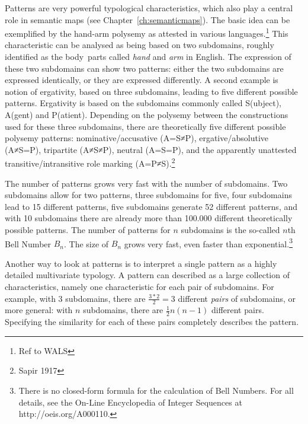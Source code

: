 %
Patterns are very powerful typological characteristics, which also play a central role in semantic maps (see Chapter~\ref{ch:semanticmaps}). The basic idea can be exemplified by the hand-arm polysemy as attested in various languages.\footnote{Ref to WALS} This characteristic can be analysed as being based on two subdomains, roughly identified as the body~parts called \textit{hand} and \textit{arm} in English. The expression of these two subdomains can show two patterns: either the two subdomains are expressed identically, or they are expressed differently. A second example is notion of ergativity, based on three subdomains, leading to five different possible patterns. Ergativity is based on the subdomains commonly called S(ubject), A(gent) and P(atient). Depending on the polysemy between the  constructions used for these three subdomains, there are theoretically five different possible polysemy patterns: nominative/accusative (A=S≠P), ergative/absolutive (A≠S=P), tripartite (A≠S≠P), neutral (A=S=P), and the apparently unattested transitive/intransitive role marking (A=P≠S).\footnote{Sapir 1917}

The number of patterns grows very fast with the number of subdomains. Two subdomains allow for two patterns, three subdomains for five, four subdomains lead to 15 different patterns, five subdomains generate 52 different patterns, and with 10 subdomains there are already more than 100.000 different theoretically possible patterns. The number of patterns for $n$ subdomains is the so-called $n$th Bell Number $B_{n}$. The size of $B_{n}$ grows very fast, even faster than exponential.\footnote{There is no closed-form formula for the calculation of Bell Numbers. For all details, see the On-Line Encyclopedia of Integer Sequences at http://oeis.org/A000110.}

Another way to look at patterns is to interpret a single pattern as a highly detailed multivariate typology. A pattern can described as a large collection of characteristics, namely one characteristic for each pair of subdomains. For example, with 3 subdomains, there are $\frac{3*2}{2} = 3$ different \emph{pairs} of subdomains, or more general: with $n$ subdomains, there are $\frac{1}{2}n(n-1)$ different pairs. Specifying the similarity for each of these pairs completely describes the pattern. 

